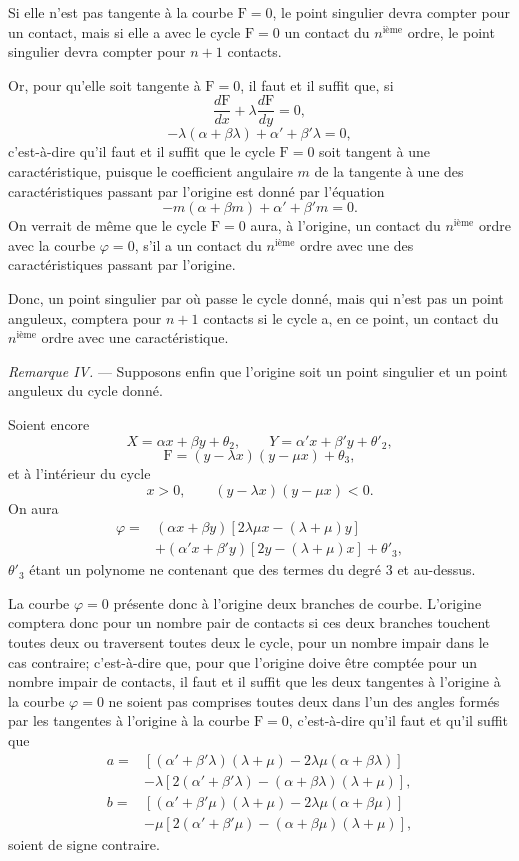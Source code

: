 \documentclass[11pt]{article}
\begin{document}
Si elle n’est pas tangente à la courbe $\mathrm F=0$, le point singulier devra compter pour un contact, mais si elle a avec le cycle $\mathrm F=0$ un contact du $n^{\text{ième}}$ ordre, le point singulier devra compter pour $n+1$ contacts.

Or, pour qu’elle soit tangente à $\mathrm F=0$, il faut et il suffit que, si
\[
\frac{d\mathrm F}{dx}+\lambda\frac{d\mathrm F}{dy}=0,
\]
\[
-\lambda(\alpha+\beta\lambda)+\alpha'+\beta'\lambda=0,
\]
c’est-à-dire qu’il faut et il suffit que le cycle $\mathrm F=0$ soit tangent à une caractéristique, puisque le coefficient angulaire $m$ de la tangente à une des caractéristiques passant par l’origine est donné par l’équation
\[
-m(\alpha+\beta m)+\alpha'+\beta'm=0.
\]
On verrait de même que le cycle $\mathrm F=0$ aura, à l’origine, un contact du $n^{\text{ième}}$ ordre avec la courbe $\varphi=0$, s’il a un contact du $n^{\text{ième}}$ ordre avec une des caractéristiques passant par l’origine.

Donc, un point singulier par où passe le cycle donné, mais qui n’est pas un point anguleux, comptera pour $n+1$ contacts si le cycle a, en ce point, un contact du $n^{\text{ième}}$ ordre avec une caractéristique.

\emph{Remarque IV.} --- Supposons enfin que l’origine soit un point singulier et un point anguleux du cycle donné.

Soient encore
\[
X=\alpha x+\beta y+\theta_2,
\qquad
Y=\alpha'x+\beta'y+\theta'_2,
\]
\[
\mathrm F=(y-\lambda x)(y-\mu x)+\theta_3,
\]
et à l’intérieur du cycle
\[
x>0,
\qquad
(y-\lambda x)(y-\mu x)<0.
\]
On aura
\[
\begin{aligned}
\varphi={}&(\alpha x+\beta y)[2\lambda\mu x-(\lambda+\mu)y]\\
&+(\alpha'x+\beta'y)[2y-(\lambda+\mu)x]+\theta'_3,
\end{aligned}
\]
$\theta'_3$ étant un polynome ne contenant que des termes du degré $3$ et au-dessus.

La courbe $\varphi=0$ présente donc à l’origine deux branches de courbe. L’origine comptera donc pour un nombre pair de contacts si ces deux branches touchent toutes deux ou traversent toutes deux le cycle, pour un nombre impair dans le cas contraire; c’est-à-dire que, pour que l’origine doive être comptée pour un nombre impair de contacts, il faut et il suffit que les deux tangentes à l’origine à la courbe $\varphi=0$ ne soient pas comprises toutes deux dans l’un des angles formés par les tangentes à l’origine à la courbe $\mathrm F=0$, c’est-à-dire qu’il faut et qu’il suffit que
\[
\begin{aligned}
a={}&[(\alpha'+\beta'\lambda)(\lambda+\mu)-2\lambda\mu(\alpha+\beta\lambda)]\\
&-\lambda[2(\alpha'+\beta'\lambda)-(\alpha+\beta\lambda)(\lambda+\mu)],\\
b={}&[(\alpha'+\beta'\mu)(\lambda+\mu)-2\lambda\mu(\alpha+\beta\mu)]\\
&-\mu[2(\alpha'+\beta'\mu)-(\alpha+\beta\mu)(\lambda+\mu)],
\end{aligned}
\]
soient de signe contraire.
\end{document}
